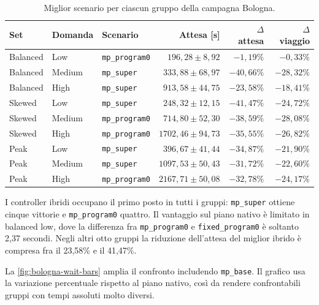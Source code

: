 \documentclass[12pt,a4paper,oneside]{report}
\numberwithin{equation}{chapter}
\begin{document}
\begin{table}[htbp]
    \centering
    \small
    \caption{Miglior scenario per ciascun gruppo della campagna Bologna.}
    \label{tab:bologna-winners}
    \begin{tabular}{lllrrr}
        \toprule
        Set & Domanda & Scenario & Attesa [s] & $\Delta$ attesa & $\Delta$ viaggio \\
        \midrule
        Balanced & Low    & \texttt{mp\_program0} & $196{,}28\pm8{,}92$   & $-1{,}19\%$  & $-0{,}33\%$ \\
        Balanced & Medium & \texttt{mp\_super}    & $333{,}88\pm68{,}97$  & $-40{,}66\%$ & $-28{,}32\%$ \\
        Balanced & High   & \texttt{mp\_super}    & $913{,}58\pm44{,}75$  & $-23{,}58\%$ & $-18{,}41\%$ \\
        Skewed    & Low    & \texttt{mp\_super}    & $248{,}32\pm12{,}15$  & $-41{,}47\%$ & $-24{,}72\%$ \\
        Skewed    & Medium & \texttt{mp\_program0} & $714{,}80\pm52{,}30$  & $-38{,}59\%$ & $-28{,}08\%$ \\
        Skewed    & High   & \texttt{mp\_program0} & $1702{,}46\pm94{,}73$ & $-35{,}55\%$ & $-26{,}82\%$ \\
        Peak      & Low    & \texttt{mp\_super}    & $396{,}67\pm41{,}44$  & $-34{,}87\%$ & $-21{,}90\%$ \\
        Peak      & Medium & \texttt{mp\_super}    & $1097{,}53\pm50{,}43$ & $-31{,}72\%$ & $-22{,}60\%$ \\
        Peak      & High   & \texttt{mp\_program0} & $2167{,}71\pm50{,}08$ & $-32{,}78\%$ & $-24{,}17\%$ \\
        \bottomrule
    \end{tabular}
\end{table}

I controller ibridi occupano il primo posto in tutti i gruppi:
\texttt{mp\_super} ottiene cinque vittorie e \texttt{mp\_program0} quattro.
Il vantaggio sul piano nativo è limitato in balanced low, dove la differenza
fra \texttt{mp\_program0} e \texttt{fixed\_program0} è soltanto 2,37
secondi. Negli altri otto gruppi la riduzione dell'attesa del miglior ibrido è
compresa fra il 23,58\% e il 41,47\%.

La \cref{fig:bologna-wait-bars} amplia il confronto includendo
\texttt{mp\_base}. Il grafico usa la variazione percentuale rispetto al piano
nativo, così da rendere confrontabili gruppi con tempi assoluti molto diversi.
\end{document}
